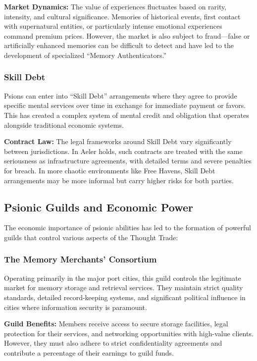 \documentclass[11pt,twoside]{article}
\begin{document}
\textbf{Market Dynamics:} The value of experiences fluctuates based on rarity, intensity, and cultural significance. Memories of historical events, first contact with supernatural entities, or particularly intense emotional experiences command premium prices. However, the market is also subject to fraud---false or artificially enhanced memories can be difficult to detect and have led to the development of specialized ``Memory Authenticators.''

\subsubsection{Skill Debt}
Psions can enter into ``Skill Debt'' arrangements where they agree to provide specific mental services over time in exchange for immediate payment or favors. This has created a complex system of mental credit and obligation that operates alongside traditional economic systems.

\textbf{Contract Law:} The legal frameworks around Skill Debt vary significantly between jurisdictions. In Aeler holds, such contracts are treated with the same seriousness as infrastructure agreements, with detailed terms and severe penalties for breach. In more chaotic environments like Free Havens, Skill Debt arrangements may be more informal but carry higher risks for both parties.

\subsection{Psionic Guilds and Economic Power}

The economic importance of psionic abilities has led to the formation of powerful guilds that control various aspects of the Thought Trade:

\subsubsection{The Memory Merchants' Consortium}
Operating primarily in the major port cities, this guild controls the legitimate market for memory storage and retrieval services. They maintain strict quality standards, detailed record-keeping systems, and significant political influence in cities where information security is paramount.

\textbf{Guild Benefits:} Members receive access to secure storage facilities, legal protection for their services, and networking opportunities with high-value clients. However, they must also adhere to strict confidentiality agreements and contribute a percentage of their earnings to guild funds.
\end{document}
